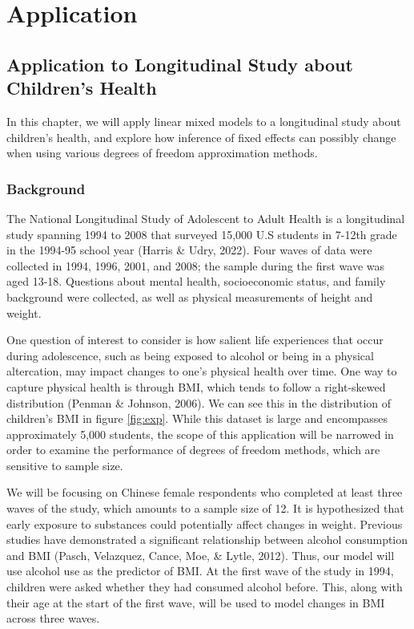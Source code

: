 \documentclass[12pt, twoside]{amherstthesis}
\begin{document}
\hypertarget{math-sci}{%
\chapter{Application}\label{math-sci}}

\hypertarget{application-to-longitudinal-study-about-childrens-health}{%
\section{Application to Longitudinal Study about Children's Health}\label{application-to-longitudinal-study-about-childrens-health}}

In this chapter, we will apply linear mixed models to a longitudinal study about children's health, and explore how inference of fixed effects can possibly change when using various degrees of freedom approximation methods.

\hypertarget{background}{%
\subsection{Background}\label{background}}

The National Longitudinal Study of Adolescent to Adult Health is a longitudinal study spanning 1994 to 2008 that surveyed 15,000 U.S students in 7-12th grade in the 1994-95 school year (Harris \& Udry, 2022). Four waves of data were collected in 1994, 1996, 2001, and 2008; the sample during the first wave was aged 13-18. Questions about mental health, socioeconomic status, and family background were collected, as well as physical measurements of height and weight.

One question of interest to consider is how salient life experiences that occur during adolescence, such as being exposed to alcohol or being in a physical altercation, may impact changes to one's physical health over time. One way to capture physical health is through BMI, which tends to follow a right-skewed distribution (Penman \& Johnson, 2006). We can see this in the distribution of children's BMI in figure \ref{fig:exp}. While this dataset is large and encompasses approximately 5,000 students, the scope of this application will be narrowed in order to examine the performance of degrees of freedom methods, which are sensitive to sample size.

We will be focusing on Chinese female respondents who completed at least three waves of the study, which amounts to a sample size of 12. It is hypothesized that early exposure to substances could potentially affect changes in weight. Previous studies have demonstrated a significant relationship between alcohol consumption and BMI (Pasch, Velazquez, Cance, Moe, \& Lytle, 2012). Thus, our model will use alcohol use as the predictor of BMI.
At the first wave of the study in 1994, children were asked whether they had consumed alcohol before. This, along with their age at the start of the first wave, will be used to model changes in BMI across three waves.
\end{document}

